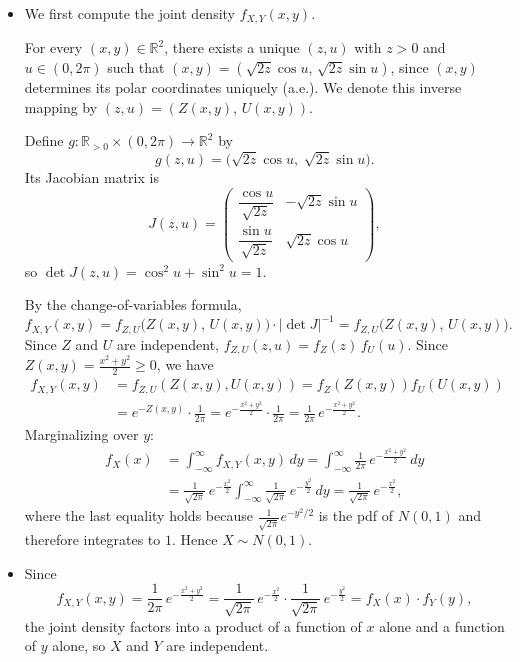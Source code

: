 \documentclass[a4paper,12pt]{article}
\begin{document}
\begin{itemize}
    \item[(a)] We first compute the joint density $f_{X,Y}(x,y)$.

    For every $(x,y) \in \mathbb{R}^2$, there exists a unique $(z,u)$ with $z > 0$ and $u \in (0,2\pi)$ such that $(x,y) = (\sqrt{2z}\cos u,\, \sqrt{2z}\sin u)$, since $(x,y)$ determines its polar coordinates uniquely (a.e.). We denote this inverse mapping by $(z,u) = (Z(x,y),\, U(x,y))$.

    Define $g : \mathbb{R}_{>0} \times (0,2\pi) \to \mathbb{R}^2$ by
    \[
        g(z,u) = \bigl(\sqrt{2z}\cos u,\; \sqrt{2z}\sin u\bigr).
    \]
    Its Jacobian matrix is
    \[
        J(z,u) = \begin{pmatrix} \dfrac{\cos u}{\sqrt{2z}} & -\sqrt{2z}\sin u \\[8pt] \dfrac{\sin u}{\sqrt{2z}} & \sqrt{2z}\cos u \end{pmatrix},
    \]
    so $\det J(z,u) = \cos^2 u + \sin^2 u = 1$.

    By the change-of-variables formula,
    \[
        f_{X,Y}(x,y) = f_{Z,U} \bigl(Z(x,y),\, U(x,y)\bigr) \cdot | \det J|^{-1} = f_{Z,U} \bigl(Z(x,y),\, U(x,y)\bigr).
    \]
    Since $Z$ and $U$ are independent, $f_{Z,U}(z,u) = f_Z(z)\,f_U(u)$. Since $Z(x,y) = \frac{x^2+y^2}{2} \geq 0$, we have
	\begin{align*}
		f_{X,Y}(x,y) &= f_{Z, U}(Z(x, y), U(x, y)) = f_Z(Z(x, y)) f_U(U(x, y)) \\
		&= e^{-Z(x, y)} \cdot \frac{1}{2 \pi} = e^{-\frac{x^2+y^2}{2}} \cdot \frac{1}{2\pi} = \frac{1}{2\pi}\,e^{-\frac{x^2+y^2}{2}}.
	\end{align*}
    Marginalizing over $y$:
    \begin{align*}
        f_X(x) &= \int_{-\infty}^{\infty} f_{X,Y}(x,y)\,dy = \int_{-\infty}^{\infty} \frac{1}{2\pi}\,e^{-\frac{x^2+y^2}{2}}\,dy \\
        &= \frac{1}{\sqrt{2\pi}}\,e^{-\frac{x^2}{2}} \int_{-\infty}^{\infty} \frac{1}{\sqrt{2\pi}}\,e^{-\frac{y^2}{2}}\,dy = \frac{1}{\sqrt{2\pi}}\,e^{-\frac{x^2}{2}},
    \end{align*}
    where the last equality holds because $\frac{1}{\sqrt{2\pi}}e^{-y^2/2}$ is the pdf of $N(0,1)$ and therefore integrates to $1$. Hence $X \sim N(0,1)$.

    \item[(b)] Since
    \[
        f_{X,Y}(x,y) = \frac{1}{2\pi}\,e^{-\frac{x^2+y^2}{2}} = \frac{1}{\sqrt{2\pi}}\,e^{-\frac{x^2}{2}} \cdot \frac{1}{\sqrt{2\pi}}\,e^{-\frac{y^2}{2}} = f_X(x) \cdot f_Y(y),
    \]
    the joint density factors into a product of a function of $x$ alone and a function of $y$ alone, so $X$ and $Y$ are independent.
\end{itemize}
\end{document}
